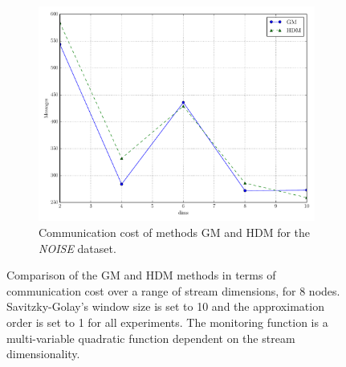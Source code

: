 \begin{figure}[!htb]
\begin{subfigure}{0.32\textwidth}
  \includegraphics[width=\linewidth]{img/main_msg_noisyinterweaving_dims.pdf}
  \caption{Communication cost of methods GM and HDM for the \emph{NOISE} dataset.}
\end{subfigure}
\vspace{0.5cm}
\caption{Comparison of the GM and HDM methods in terms of communication cost over a range of stream dimensions, for 8 nodes. Savitzky-Golay's window size is set to 10 and the approximation order is set to 1 for all experiments. The monitoring function is a multi-variable quadratic function dependent on the stream dimensionality.} \label{fig:mainComp-dims}
\end{figure}


